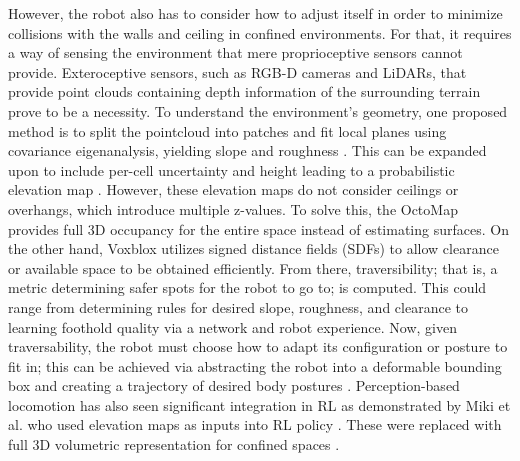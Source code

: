 However, the robot also has to consider how to adjust itself in order to minimize collisions with the walls and ceiling in confined environments. For that, it requires a way of sensing the environment that mere proprioceptive sensors cannot provide. Exteroceptive sensors, such as RGB-D cameras and LiDARs, that provide point clouds containing depth information of the surrounding terrain prove to be a necessity. To understand the environment's geometry, one proposed method is to split the pointcloud into patches and fit local planes using covariance eigenanalysis, yielding slope and roughness \cite{3DSLAMUsing}. This can be expanded upon to include per-cell uncertainty and height leading to a probabilistic elevation map \cite{fankhauserRobotcentricElevationMapping2014, PDFProbabilisticTerrain}. However, these elevation maps do not consider ceilings or overhangs, which introduce multiple z-values. To solve this, the OctoMap \cite{hornungOctoMapEfficientProbabilistic2013} provides full 3D occupancy for the entire space instead of estimating surfaces. On the other hand, Voxblox \cite{oleynikovaVoxbloxIncremental3D2017} utilizes signed distance fields (SDFs) to allow clearance or available space to be obtained efficiently. From there, traversibility; that is, a metric determining safer spots for the robot to go to; is computed. This could range from determining rules for desired slope, roughness, and clearance to learning foothold quality via a network and robot experience. Now, given traversability, the robot must choose how to adapt its configuration or posture to fit in; this can be achieved via abstracting the robot into a deformable bounding box and creating a trajectory of desired body postures \cite{buchananWalkingPostureAdaptation2019, buchananPerceptiveWholebodyPlanning2021}. Perception-based locomotion has also seen significant integration in RL as demonstrated by Miki et al. who used elevation maps as inputs into RL policy \cite{mikiLearningRobustPerceptive2022}. These were replaced with full 3D volumetric representation for confined spaces \cite{mikiLearningWalkConfined2024}. 
